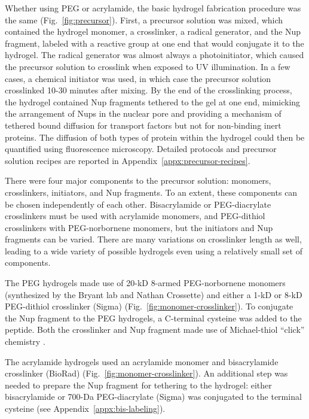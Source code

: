 Whether using PEG or acrylamide, the basic hydrogel fabrication procedure was the same (Fig.~\ref{fig:precursor}).  First, a precursor solution was mixed, which contained the hydrogel monomer, a crosslinker, a radical generator, and the Nup fragment, labeled with a reactive group at one end that would conjugate it to the hydrogel.  The radical generator was almost always a photoinitiator, which caused the precursor solution to crosslink when exposed to UV illumination.  In a few cases, a chemical initiator was used, in which case the precursor solution crosslinked 10-30 minutes after mixing.  By the end of the crosslinking process, the hydrogel contained Nup fragments tethered to the gel at one end, mimicking the arrangement of Nups in the nuclear pore and providing a mechanism of tethered bound diffusion for transport factors but not for non-binding inert proteins.  The diffusion of both types of protein within the hydrogel could then be quantified using fluorescence microscopy.  Detailed protocols and precursor solution recipes are reported in Appendix~\ref{appx:precursor-recipes}.

There were four major components to the precursor solution: monomers, crosslinkers, initiators, and Nup fragments.  To an extent, these components can be chosen independently of each other.  Bisacrylamide or PEG-diacrylate crosslinkers must be used with acrylamide monomers, and PEG-dithiol crosslinkers with PEG-norbornene monomers, but the initiators and Nup fragments can be varied.  There are many variations on crosslinker length as well, leading to a wide variety of possible hydrogels even using a relatively small set of components.

The PEG hydrogels made use of 20-kD 8-armed PEG-norbornene monomers (synthesized by the Bryant lab and Nathan Crossette) and either a 1-kD or 8-kD PEG-dithiol crosslinker (Sigma) (Fig.~\ref{fig:monomer-crosslinker}).  To conjugate the Nup fragment to the PEG hydrogels, a C-terminal cysteine was added to the peptide.  Both the crosslinker and Nup fragment made use of Michael-thiol ``click'' chemistry \cite{chatani14}\cite{nair14}.

The acrylamide hydrogels used an acrylamide monomer and bisacrylamide crosslinker (BioRad) (Fig.~\ref{fig:monomer-crosslinker}).  An additional step was needed to prepare the Nup fragment for tethering to the hydrogel: either bisacrylamide or 700-Da PEG-diacrylate (Sigma) was conjugated to the terminal cysteine (see Appendix~\ref{appx:bis-labeling}).

